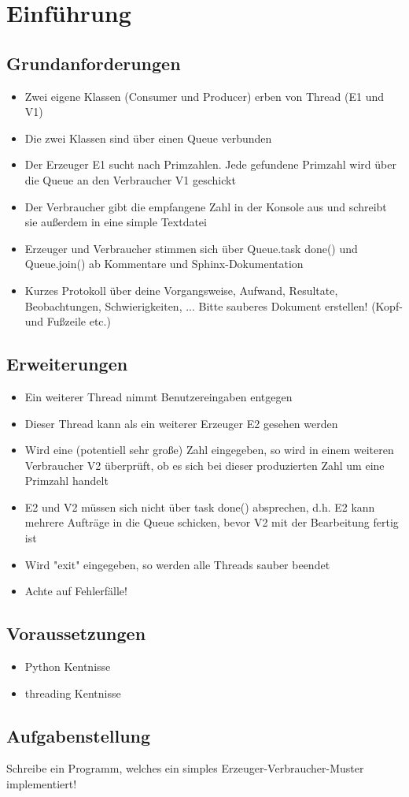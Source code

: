 
\section{Einführung}

\subsection{Grundanforderungen}

\begin{itemize}
	\item Zwei eigene Klassen (Consumer und Producer) erben von Thread (E1 und V1)
	\item Die zwei Klassen sind über einen Queue verbunden
	\item Der Erzeuger E1 sucht nach Primzahlen. Jede gefundene Primzahl wird über die Queue an den Verbraucher V1 geschickt
	\item Der Verbraucher gibt die empfangene Zahl in der Konsole aus und schreibt sie außerdem in eine simple Textdatei
	\item Erzeuger und Verbraucher stimmen sich über Queue.task done() und Queue.join() ab Kommentare und Sphinx-Dokumentation
	\item Kurzes Protokoll über deine Vorgangsweise, Aufwand, Resultate, Beobachtungen, Schwierigkeiten, ... Bitte sauberes Dokument erstellen! (Kopf- und Fußzeile etc.)
\end{itemize}

\subsection{Erweiterungen}

\begin{itemize}
	\item Ein weiterer Thread nimmt Benutzereingaben entgegen
	\item Dieser Thread kann als ein weiterer Erzeuger E2 gesehen werden
	\item Wird eine (potentiell sehr große) Zahl eingegeben, so wird in einem weiteren Verbraucher V2 überprüft, ob es sich bei dieser produzierten Zahl um eine Primzahl handelt
	\item E2 und V2 müssen sich nicht über task done() absprechen, d.h. E2 kann mehrere Aufträge in die Queue schicken, bevor V2 mit der Bearbeitung fertig ist
	\item Wird "exit" eingegeben, so werden alle Threads sauber beendet
	\item Achte auf Fehlerfälle!
\end{itemize}

\subsection{Voraussetzungen}

\begin{itemize}
	\item Python Kentnisse
	\item threading Kentnisse
\end{itemize}


\subsection{Aufgabenstellung}

Schreibe ein Programm, welches ein simples Erzeuger-Verbraucher-Muster implementiert!
\clearpage

